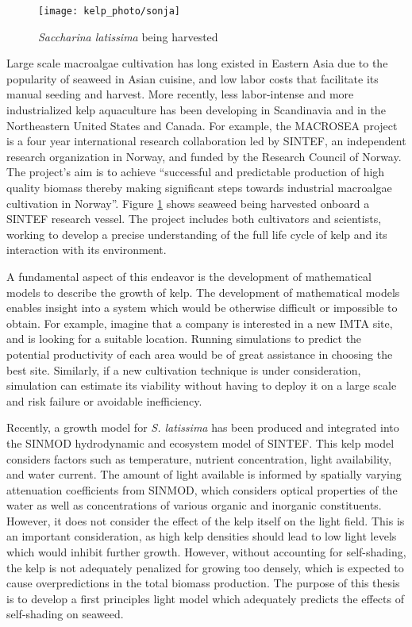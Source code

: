 \documentclass[ms,cpyr,lof,lot]{uathesis}
\begin{document}
\begin{figure}[h]
  \centering
  \texttt{[image: kelp\_photo/sonja]}
  \caption{\textit{Saccharina latissima} being harvested}
  \label{fig:sonja}
\end{figure}

Large scale macroalgae cultivation has long existed in Eastern Asia due to the popularity of seaweed in Asian cuisine, and low labor costs that facilitate its manual seeding and harvest.
  More recently, less labor-intense and more industrialized kelp aquaculture has been developing in Scandinavia and in the Northeastern United States and Canada.
  For example, the MACROSEA project is a four year international research collaboration led by SINTEF, an independent research organization in Norway, and funded by the Research Council of Norway.
  The project's aim is to achieve ``successful and predictable production of high quality biomass thereby making significant steps towards industrial macroalgae cultivation in Norway''.
Figure \ref{fig:sonja} shows seaweed being harvested onboard a SINTEF research vessel.
The project includes both cultivators and scientists, working to develop a precise understanding of the full life cycle of kelp and its interaction with its environment.

A fundamental aspect of this endeavor is the development of mathematical models to describe the growth of kelp.
The development of mathematical models enables insight into a system which would be otherwise difficult or impossible to obtain.
For example, imagine that a company is interested in a new IMTA site, and is looking for a suitable location.
Running simulations to predict the potential productivity of each area would be of great assistance in choosing the best site.
Similarly, if a new cultivation technique is under consideration, simulation can estimate its viability without
having to deploy it on a large scale and risk failure or avoidable inefficiency.

Recently, a growth model \cite{broch_modelling_2012} for \textit{S. latissima} has been produced and integrated into the SINMOD \cite{wassmann_modelling_2006} hydrodynamic and ecosystem model of SINTEF.
This kelp model considers factors such as temperature, nutrient concentration, light availability, and water current.
The amount of light available is informed by spatially varying attenuation coefficients from SINMOD,
which considers optical properties of the water as well as concentrations of various organic and inorganic constituents.
However, it does not consider the effect of the kelp itself on the light field.
This is an important consideration, as high kelp densities should lead to low light levels which would inhibit further growth.
However, without accounting for self-shading, the kelp is not adequately penalized for growing too densely,
which is expected to cause overpredictions in the total biomass production.
The purpose of this thesis is to develop a first principles light model which adequately predicts the effects of self-shading on seaweed.
\end{document}
